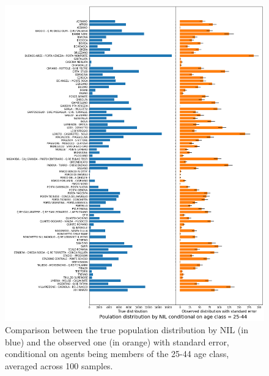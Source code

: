 \begin{figure}[H]
    \centering
    \includegraphics[scale = 0.45]{tex/pics/pop_by_nil_25.png}
    \caption{Comparison between the true population distribution by NIL (in blue) and the observed one (in orange) with standard error, conditional on agents being members of the 25-44 age class, averaged across 100 samples.}
    \label{pop_nil_25}
\end{figure}

